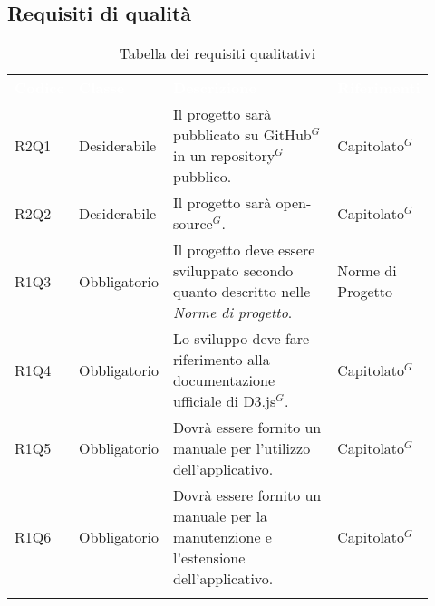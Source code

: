 \subsection{Requisiti di qualità}
{\renewcommand{\arraystretch}{1.5}
\begin{longtable}{p{0.12\linewidth}p{0.15\linewidth}p{0.50\linewidth}p{0.15\linewidth}}
	\rowcolor[RGB]{33, 73, 50}
	\textcolor{white}{\textbf{Codice}} & \textcolor{white}{\textbf{Classe}} & \textcolor{white}{\textbf{Descrizione}} &
    \textcolor{white}{\textbf{Riferimenti}}\\
    
    \rowcolor[RGB]{216, 235, 171}
    R2Q1 & Desiderabile & Il progetto sarà pubblicato su GitHub$^{G}$ in un repository$^{G}$ pubblico. & Capitolato$^{G}$\\
    \rowcolor[RGB]{233, 245, 206}
    R2Q2 & Desiderabile & Il progetto sarà open-source$^{G}$. & Capitolato$^{G}$\\ 
    \rowcolor[RGB]{216, 235, 171}
    R1Q3 & Obbligatorio & Il progetto deve essere sviluppato secondo quanto descritto nelle \textit{Norme di progetto}. & Norme di Progetto\\
    \rowcolor[RGB]{233, 245, 206}
    R1Q4 & Obbligatorio & Lo sviluppo deve fare riferimento alla documentazione ufficiale di D3.js$^{G}$. & Capitolato$^{G}$\\
    \rowcolor[RGB]{216, 235, 171}
    R1Q5 & Obbligatorio & Dovrà essere fornito un manuale per l'utilizzo dell'applicativo. & Capitolato$^{G}$\\
    \rowcolor[RGB]{233, 245, 206}
    R1Q6 & Obbligatorio & Dovrà essere fornito un manuale per la manutenzione e l'estensione dell'applicativo. & Capitolato$^{G}$\\ 
    
    \caption{Tabella dei requisiti qualitativi}
\end{longtable}	
}

